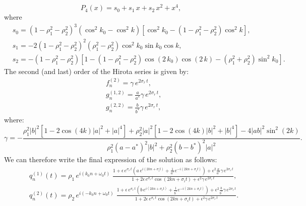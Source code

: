 \documentclass{article}
\begin{document}
\begin{equation}\label{quartic}
    P_4(x)=s_0+s_1\, x+s_2\, x^2+x^4,
\end{equation}
where
\begin{equation*}
\begin{split}
&s_0=(1-\rho_1^2-\rho_2^2)^3\left(\cos^2k_0-\cos^2 k\right)\left[\cos^2k_0-(1-\rho_1^2-\rho_2^2)\cos^2k\right],\\[2mm]
&s_1=-2(1-\rho_1^2-\rho_2^2)^2(\rho_1^2-\rho_2^2)\cos^2k_0\sin k_0\cos k,\\[2mm]
&s_2=-(1-\rho_1^2-\rho_2^2)\left[1-(1-\rho_1^2-\rho_2^2)\cos(2 \,k_0)\cos(2\,k)-(\rho_1^2+\rho_2^2)\sin^2k_0\right].
\end{split}    
\end{equation*}
The second (and last) order of the Hirota series is given by:
\begin{equation}
    \begin{split}
       & f^{(2)}_n=\gamma\,e^{2\sigma_r\,t}, \\
        & g_n^{(1,2)}=\frac{a}{a^*}\gamma\,e^{2\sigma_r\,t},\\
         & g_n^{(2,2)}=\frac{b}{b^*}\gamma\,e^{2\sigma_r\,t},
    \end{split}
\end{equation}
where:\\
\begin{equation}
    \gamma=-\frac{\rho_1^2|b|^2\left[1-2\cos(4 k)|a|^2+|a|^4\right]+\rho_2^2|a|^2\left[1-2\cos(4 k)|b|^2+|b|^4\right]-4|ab|^2\sin^2(2 k)}{\rho_1^2(a-a^*)^2|b|^2+\rho_2^2(b-b^*)^2|a|^2}.
\end{equation}
We can therefore write the final expression of the solution as follows:
\begin{equation}\label{counter_sol}
\begin{split}
       & q^{(1)}_n(t)=\rho_1\,e^{i(k_0 n+\omega_0 t)}\;\frac{1+\epsilon\, e^{\sigma_r\,t}\left( a\,e^{i(2  k n+\sigma_i t)}+\frac{1}{a^*}e^{-i(2  k n+\sigma_i t)}\right)+\epsilon^2\frac{a}{a^*}\gamma\,e^{2\sigma_r\,t}}{1+2\epsilon\,e^{\sigma_r\,t}\cos(2  k n+\sigma_i t)+\epsilon^2\gamma\,e^{2\sigma_r\,t}},\\[2mm]
  &  q^{(2)}_n(t)=\rho_2\,e^{i(-k_0 n+\omega_0 t)}\;\frac{1+\epsilon\, e^{\sigma_r\,t}\left( b\,e^{i(2  k n+\sigma_i t)}+\frac{1}{b^*}e^{-i(2  k n+\sigma_i t)}\right)+\epsilon^2\frac{b}{b^*}\gamma\,e^{2\sigma_r\,t}}{1+2\epsilon\,e^{\sigma_r\,t}\cos(2  k n+\sigma_i t)+\epsilon^2\gamma\,e^{2\sigma_r\,t}}.
    \end{split}
\end{equation}
\end{document}
